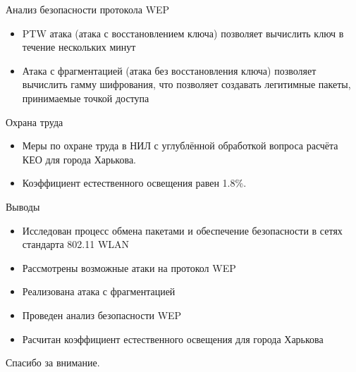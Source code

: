 \documentclass[12pt]{beamer}
\begin{document}
\begin{frame}{Анализ безопасности протокола WEP}

    \begin{itemize}

        \item PTW атака (атака с восстановлением ключа) позволяет вычислить ключ
        в течение нескольких минут

        \item Атака с фрагментацией (атака без восстановления ключа) позволяет
        вычислить гамму шифрования, что позволяет создавать легитимные пакеты,
        принимаемые точкой доступа

    \end{itemize}

\end{frame} 


\begin{frame}{Охрана труда}

    \begin{itemize}
        \item Меры по охране труда в НИЛ с углублённой обработкой вопроса расчёта КЕО для города Харькова.
        \item Коэффициент естественного освещения равен 1.8\%.
    \end{itemize}

\end{frame} 


\begin{frame}{Выводы}

    \begin{itemize}
        \item Исследован процесс обмена пакетами и обеспечение безопасности в сетях стандарта 802.11 WLAN
        \item Рассмотрены возможные атаки на протокол WEP
        \item Реализована атака с фрагментацией
        \item Проведен анализ безопасности WEP
        \item Расчитан коэффициент естественного освещения для города Харькова
    \end{itemize}

\end{frame} 


\begin{frame}{}

    \begin{center}
        Спасибо за внимание.
    \end{center}

\end{frame}
\end{document}
